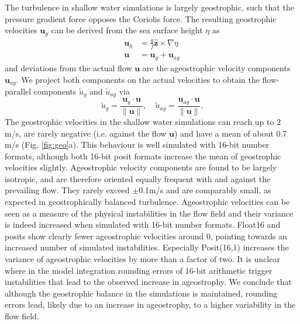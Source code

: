 The turbulence in shallow water simulations is largely geostrophic, such that the pressure gradient force opposes the Coriolis force.
The resulting geostrophic velocities $\mathbf{u}_g$ can be derived from the sea surface height $\eta$ as
\begin{subequations}
\begin{align}
\mathbf{u}_g &= \frac{g}{f}\hat{\mathbf{z}} \times \nabla \eta \\
\mathbf{u} &= \mathbf{u}_{g} + \mathbf{u}_{ag}
\end{align}
\label{eq:geo}%
\end{subequations}
and deviations from the actual flow $\mathbf{u}$ are the ageostrophic velocity components $\mathbf{u}_{ag}$. We project both
components on the actual velocities to obtain the flow-parallel components $\tilde{u}_{g}$ and $\tilde{u}_{ag}$ via
\begin{equation}
\tilde{u}_g = \frac{\mathbf{u}_g \cdot \mathbf{u}}{\| \mathbf{u} \|},
\quad \tilde{u}_{ag} = \frac{\mathbf{u}_{ag} \cdot \mathbf{u}}{\| \mathbf{u} \|}.
\label{eq:parallel}%
\end{equation}
The geostrophic velocities in the shallow water simulations can reach up to 2 m/s, are rarely negative (i.e. against the flow
$\mathbf{u}$) and have a mean of about 0.7 m/s (Fig. \ref{fig:geo}a). This behaviour is well simulated with 16-bit number
formats, although both 16-bit posit formats increase the mean of geostrophic velocities slightly. Ageostrophic velocity components
are found to be largely isotropic, and are therefore oriented equally frequent with and against the prevailing flow. They rarely exceed
$\pm$0.1m/s and are comparably small, as expected in geostrophically balanced turbulence. Ageostrophic velocities can be seen
as a measure of the physical instabilities in the flow field and their variance is indeed increased when simulated with 16-bit number
formats. Float16 and posits show clearly fewer ageostrophic velocities around 0, pointing towards an increased number of simulated
instabilities. Especially Posit(16,1) increases the variance of ageostrophic velocities by more than a factor of two. It is unclear where
in the model integration rounding errors of 16-bit arithmetic trigger instabilities that lead to the observed increase in ageostrophy.
We conclude that although the geostrophic balance in the simulations is maintained, rounding errors lead, likely due to an increase
in ageostrophy, to a higher variability in the flow field.

